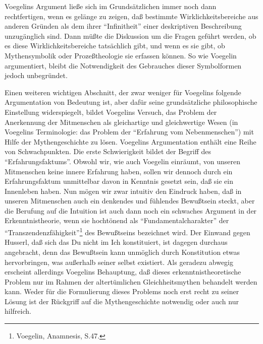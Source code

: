 Voegelins Argument ließe sich im Grundsätzlichen immer noch dann
rechtfertigen, wenn es gelänge zu zeigen, daß bestimmte Wirklichkeitsbereiche
aus anderen Gründen als dem ihrer "`Infinitheit"' einer deskriptiven
Beschreibung unzugänglich sind. Dann müßte die Diskussion um die Fragen
geführt werden, ob es diese Wirklichkeitsbereiche tatsächlich gibt, und wenn
es sie gibt, ob Mythensymbolik oder Prozeßtheologie sie erfassen können. So wie
Voegelin argumentiert, bleibt die Notwendigkeit des Gebrauches dieser
Symbolformen jedoch unbegründet. 

Einen weiteren wichtigen Abschnitt, der zwar weniger für Voegelins folgende
Argumentation von Bedeutung ist, aber dafür seine grundsätzliche philosophische
Einstellung widerspiegelt, bildet Voegelins Versuch, das Problem der
Anerkennung der Mitmenschen als gleichartige und gleichwertige Wesen (in
Voegelins Terminologie: das Problem der "`Erfahrung vom Nebenmenschen"') mit
Hilfe der Mythengeschichte zu lösen. Voegelins Argumentation enthält eine
Reihe von Schwachpunkten. Die erste Schwierigkeit bildet der Begriff des
"`Erfahrungsfaktums"'. Obwohl wir, wie auch Voegelin einräumt, von unseren
Mitmenschen keine innere Erfahrung haben, sollen wir dennoch durch ein
Erfahrungsfaktum unmittelbar davon in Kenntnis gesetzt sein, daß sie ein
Innenleben haben. Nun mögen wir zwar intuitiv den Eindruck haben, daß in
unseren Mitmenschen auch ein denkendes und fühlendes Bewußtsein steckt, aber
die Berufung auf die Intuition ist auch dann noch ein schwaches Argument in
der Erkenntnistheorie, wenn sie hochtönend als "`Fundamentalcharakter"' der
"`Transzendenzfähigkeit"'\footnote{Voegelin, Anamnesis, S.47.} des Bewußtseins
bezeichnet wird. Der Einwand gegen Husserl, daß sich das Du nicht im Ich
konstituiert, ist dagegen durchaus angebracht, denn das Bewußtsein kann
unmöglich durch Konstitution etwas hervorbringen, was außerhalb seiner selbst
existiert. Als geradezu abwegig erscheint allerdings Voegelins Behauptung, daß
dieses erkenntnistheoretische Problem nur im Rahmen der altertümlichen
Gleichheitsmythen behandelt werden kann. Weder für die Formulierung dieses
Problems noch erst recht zu seiner Lösung ist der Rückgriff auf die
Mythengeschichte notwendig oder auch nur hilfreich.

